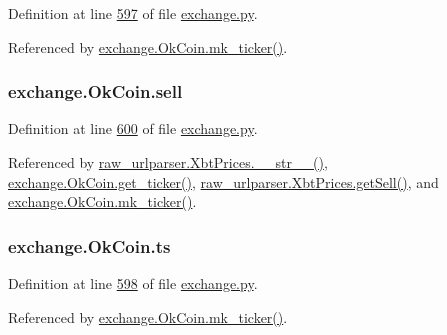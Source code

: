 Definition at line \hyperlink{exchange_8py_source_l00597}{597} of file \hyperlink{exchange_8py_source}{exchange.\+py}.



Referenced by \hyperlink{exchange_8py_source_l00622}{exchange.\+Ok\+Coin.\+mk\+\_\+ticker()}.

\subsubsection[{\texorpdfstring{sell}{sell}}]{\setlength{\rightskip}{0pt plus 5cm}exchange.\+Ok\+Coin.\+sell}\hypertarget{classexchange_1_1_ok_coin_aadb487d2e2f277374a747e1bcb0bd40b}{}\label{classexchange_1_1_ok_coin_aadb487d2e2f277374a747e1bcb0bd40b}


Definition at line \hyperlink{exchange_8py_source_l00600}{600} of file \hyperlink{exchange_8py_source}{exchange.\+py}.



Referenced by \hyperlink{raw__urlparser_8py_source_l00074}{raw\+\_\+urlparser.\+Xbt\+Prices.\+\_\+\+\_\+str\+\_\+\+\_\+()}, \hyperlink{exchange_8py_source_l00608}{exchange.\+Ok\+Coin.\+get\+\_\+ticker()}, \hyperlink{raw__urlparser_8py_source_l00065}{raw\+\_\+urlparser.\+Xbt\+Prices.\+get\+Sell()}, and \hyperlink{exchange_8py_source_l00622}{exchange.\+Ok\+Coin.\+mk\+\_\+ticker()}.

\subsubsection[{\texorpdfstring{ts}{ts}}]{\setlength{\rightskip}{0pt plus 5cm}exchange.\+Ok\+Coin.\+ts}\hypertarget{classexchange_1_1_ok_coin_a0fe6263a7f58a6fa8a688929976b7e4a}{}\label{classexchange_1_1_ok_coin_a0fe6263a7f58a6fa8a688929976b7e4a}


Definition at line \hyperlink{exchange_8py_source_l00598}{598} of file \hyperlink{exchange_8py_source}{exchange.\+py}.



Referenced by \hyperlink{exchange_8py_source_l00622}{exchange.\+Ok\+Coin.\+mk\+\_\+ticker()}.

